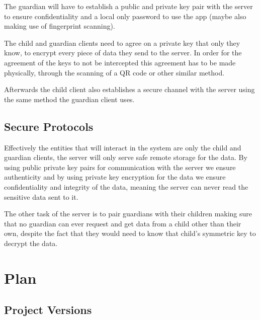 \documentclass[a4paper]{article}
\begin{document}
The guardian will have to establish a public and private key pair with the server to ensure
confidentiality and a local only password to use the app (maybe also making use of fingerprint
scanning).

The child and guardian clients need to agree on a private key that only they know, to encrypt every
piece of data they send to the server. In order for the agreement of the keys to not be intercepted
this agreement has to be made physically, through the scanning of a QR code or other similar method.

Afterwards the child client also establishes a secure channel with the server using the same method
the guardian client uses.


\subsection{Secure Protocols}
Effectively the entities that will interact in the system are only the child and guardian clients,
the server will only serve safe remote storage for the data. By using public private key pairs for
communication with the server we ensure authenticity and by using private key encryption for the
data we ensure confidentiality and integrity of the data, meaning the server can never read the
sensitive data sent to it.

The other task of the server is to pair guardians with their children making sure that no guardian
can ever request and get data from a child other than their own, despite the fact that they would
need to know that child's symmetric key to decrypt the data.

\section{Plan}

\subsection{Project Versions}
\end{document}
